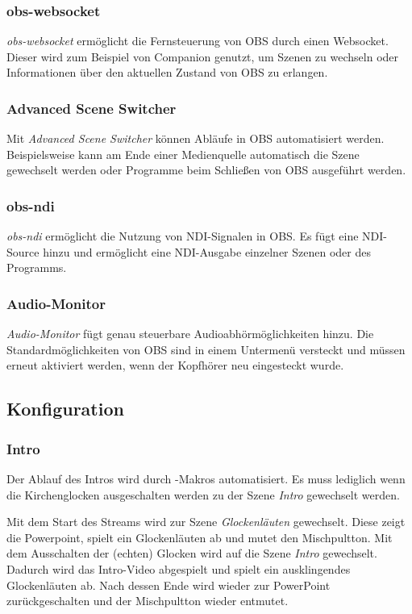 			\subsubsection{obs-websocket}
				\textit{obs-websocket} ermöglicht die Fernsteuerung von OBS durch einen Websocket.
				Dieser wird zum Beispiel von Companion genutzt, um Szenen zu wechseln oder Informationen über den aktuellen Zustand von OBS zu erlangen.
			\subsubsection{Advanced Scene Switcher}\label{obs:plugins:ass}
				Mit \textit{Advanced Scene Switcher} können Abläufe in \Gls{OBS} automatisiert werden.
				Beispielsweise kann am Ende einer Medienquelle automatisch die Szene gewechselt werden oder Programme beim Schließen von \Gls{OBS} ausgeführt werden.
			\subsubsection{obs-ndi}\label{obs:plugins:ndi}
				\textit{obs-ndi} ermöglicht die Nutzung von \Gls{NDI}-Signalen in \Gls{OBS}.
				Es fügt eine \Gls{NDI}-Source hinzu und ermöglicht eine \Gls{NDI}-Ausgabe einzelner Szenen oder des Programms.
			\subsubsection{Audio-Monitor}
				\textit{Audio-Monitor} fügt genau steuerbare Audioabhörmöglichkeiten hinzu.
				Die Standardmöglichkeiten von OBS sind in einem Untermenü versteckt und müssen erneut aktiviert werden, wenn der Kopfhörer neu eingesteckt wurde.

		\subsection{Konfiguration}
			\subsubsection{Intro}
				Der Ablauf des Intros wird durch -Makros automatisiert.
				Es muss lediglich wenn die Kirchenglocken ausgeschalten werden zu der Szene \textit{Intro} gewechselt werden.

				Mit dem Start des Streams wird zur Szene \textit{Glockenläuten} gewechselt.
				Diese zeigt die Powerpoint, spielt ein Glockenläuten ab und mutet den Mischpultton.
				Mit dem Ausschalten der (echten) Glocken wird auf die Szene \textit{Intro} gewechselt.
				Dadurch wird das Intro-Video abgespielt und spielt ein ausklingendes Glockenläuten ab.
				Nach dessen Ende wird wieder zur PowerPoint zurückgeschalten und der Mischpultton wieder entmutet.
				
